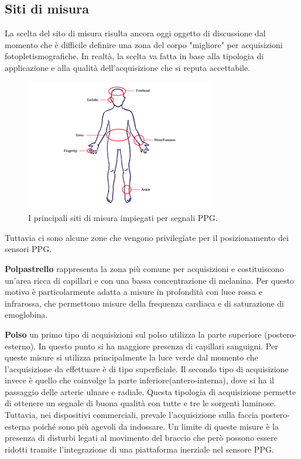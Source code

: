\subsection{Siti di misura}
La scelta del sito di misura risulta ancora oggi oggetto di discussione dal momento che è difficile definire una zona del corpo "migliore" per acquisizioni fotopletismografiche. In realtà, la scelta va fatta in base alla tipologia di applicazione e alla qualità dell'acquisizione che si reputa accettabile.
\begin{figure}[h]
	\centering
	\includegraphics[width=0.6\linewidth]{ImageFiles/Fotopletismografia/ZoneAcquisizione}
	\caption{I principali siti di misura impiegati per segnali PPG.}
	\label{fig:ZoneAcquisizione}
\end{figure}
Tuttavia ci sono alcune zone che vengono privilegiate per il posizionamento dei sensori PPG.
	 \par \textbf{Polpastrello} rappresenta la zona più comune per acquisizioni e costituiscono un'area ricca di capillari e con una bassa concentrazione di melanina. Per questo motivo è particolarmente adatta a misure in profondità con luce rossa e infrarossa, che permettono misure della frequenza cardiaca e di saturazione di emoglobina.
	 \par \textbf{Polso}
	 un primo tipo di acquisizioni sul polso utilizza la parte superiore (postero-esterno). In questo punto si ha maggiore presenza di capillari sanguigni. Per queste misure si utilizza principalmente la luce verde dal momento che l'acquisizione da effettuare è di tipo superficiale.
	 Il secondo tipo di acquisizione invece è quello che coinvolge la parte inferiore(antero-interna), dove si ha il passaggio delle arterie ulnare e radiale. Questa tipologia di acquisizione permette di ottenere un segnale di buona qualità con tutte e tre le sorgenti luminose.
	 Tuttavia, nei dispositivi commerciali, prevale l'acquisizione sulla faccia postero-esterna poiché sono più agevoli da indossare. Un limite di queste misure è la presenza di disturbi legati al movimento del braccio che però possono essere ridotti tramite l'integrazione di una piattaforma inerziale nel sensore PPG\cite{Ghamari2018}.
